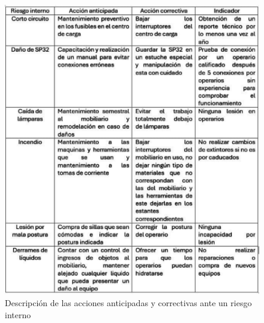     \begin{figure}[H]
        \centering
        \includegraphics[trim = {1mm 1mm 1mm 1mm},clip,scale=0.3]{8/Img/Descripcion de las acciones anticipadas.pdf}
        \caption{Descripción de las acciones anticipadas y correctivas ante un riesgo interno}
        \label{DescripcionAntInterno}
    \end{figure}
